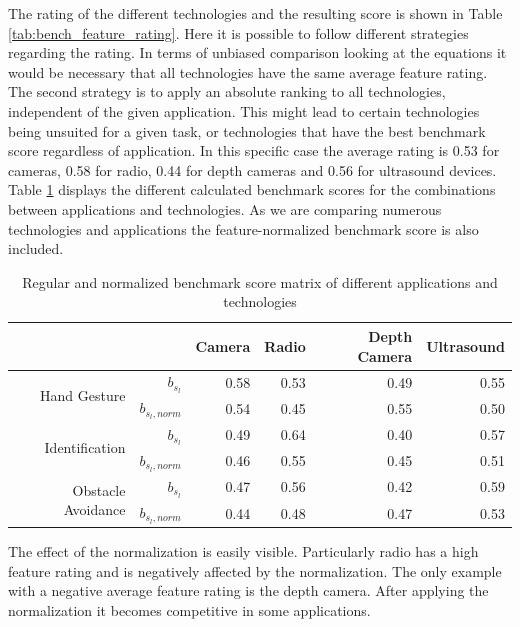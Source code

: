 The rating of the different technologies and the resulting score is shown in Table \ref{tab:bench_feature_rating}. Here it is possible to follow different strategies regarding the rating. In terms of unbiased comparison looking at the equations it would be necessary that all technologies have the same average feature rating. The second strategy is to apply an absolute ranking to all technologies, independent of the given application. This might lead to certain technologies being unsuited for a given task, or technologies that have the best benchmark score regardless of application. In this specific case the average rating is 0.53 for cameras, 0.58 for radio, 0.44 for depth cameras and 0.56 for ultrasound devices. Table \ref{tab:bench_scores} displays the different calculated benchmark scores for the combinations between applications and technologies. As we are comparing numerous technologies and applications the feature-normalized benchmark score is also included.

\begin{table}[htbp]
  \centering
  \caption{Regular and normalized benchmark score matrix of different applications and technologies}
    \begin{tabular}{rrrrrr}
    \toprule
          &       & Camera & Radio & Depth Camera & Ultrasound \\
    \midrule
    \multirow{2}[0]{*}{Hand Gesture} & $b_{s_l}$ & 0.58  & 0.53  & 0.49  & 0.55 \\
          & $b_{s_l,norm}$ & 0.54  & 0.45  & 0.55  & 0.50 \\
          \midrule
    \multirow{2}[0]{*}{Identification} & $b_{s_l}$ & 0.49  & 0.64  & 0.40  & 0.57 \\
          & $b_{s_l,norm}$ & 0.46  & 0.55  & 0.45  & 0.51 \\
          \midrule
    \multirow{2}[0]{*}{Obstacle Avoidance} & $b_{s_l}$ & 0.47  & 0.56  & 0.42  & 0.59 \\
          & $b_{s_l,norm}$ & 0.44  & 0.48  & 0.47  & 0.53 \\
    \bottomrule
    \end{tabular}%
  \label{tab:bench_scores}%
\end{table}%
The effect of the normalization is easily visible. Particularly radio has a high feature rating and is negatively affected by the normalization. The only example with a negative average feature rating is the depth camera. After applying the normalization it becomes competitive in some applications.

